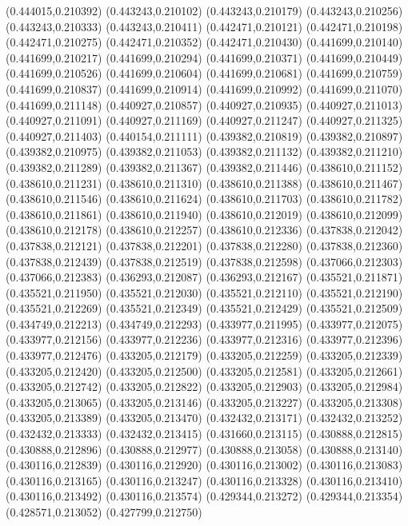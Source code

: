 (0.444015,0.210392)
(0.443243,0.210102)
(0.443243,0.210179)
(0.443243,0.210256)
(0.443243,0.210333)
(0.443243,0.210411)
(0.442471,0.210121)
(0.442471,0.210198)
(0.442471,0.210275)
(0.442471,0.210352)
(0.442471,0.210430)
(0.441699,0.210140)
(0.441699,0.210217)
(0.441699,0.210294)
(0.441699,0.210371)
(0.441699,0.210449)
(0.441699,0.210526)
(0.441699,0.210604)
(0.441699,0.210681)
(0.441699,0.210759)
(0.441699,0.210837)
(0.441699,0.210914)
(0.441699,0.210992)
(0.441699,0.211070)
(0.441699,0.211148)
(0.440927,0.210857)
(0.440927,0.210935)
(0.440927,0.211013)
(0.440927,0.211091)
(0.440927,0.211169)
(0.440927,0.211247)
(0.440927,0.211325)
(0.440927,0.211403)
(0.440154,0.211111)
(0.439382,0.210819)
(0.439382,0.210897)
(0.439382,0.210975)
(0.439382,0.211053)
(0.439382,0.211132)
(0.439382,0.211210)
(0.439382,0.211289)
(0.439382,0.211367)
(0.439382,0.211446)
(0.438610,0.211152)
(0.438610,0.211231)
(0.438610,0.211310)
(0.438610,0.211388)
(0.438610,0.211467)
(0.438610,0.211546)
(0.438610,0.211624)
(0.438610,0.211703)
(0.438610,0.211782)
(0.438610,0.211861)
(0.438610,0.211940)
(0.438610,0.212019)
(0.438610,0.212099)
(0.438610,0.212178)
(0.438610,0.212257)
(0.438610,0.212336)
(0.437838,0.212042)
(0.437838,0.212121)
(0.437838,0.212201)
(0.437838,0.212280)
(0.437838,0.212360)
(0.437838,0.212439)
(0.437838,0.212519)
(0.437838,0.212598)
(0.437066,0.212303)
(0.437066,0.212383)
(0.436293,0.212087)
(0.436293,0.212167)
(0.435521,0.211871)
(0.435521,0.211950)
(0.435521,0.212030)
(0.435521,0.212110)
(0.435521,0.212190)
(0.435521,0.212269)
(0.435521,0.212349)
(0.435521,0.212429)
(0.435521,0.212509)
(0.434749,0.212213)
(0.434749,0.212293)
(0.433977,0.211995)
(0.433977,0.212075)
(0.433977,0.212156)
(0.433977,0.212236)
(0.433977,0.212316)
(0.433977,0.212396)
(0.433977,0.212476)
(0.433205,0.212179)
(0.433205,0.212259)
(0.433205,0.212339)
(0.433205,0.212420)
(0.433205,0.212500)
(0.433205,0.212581)
(0.433205,0.212661)
(0.433205,0.212742)
(0.433205,0.212822)
(0.433205,0.212903)
(0.433205,0.212984)
(0.433205,0.213065)
(0.433205,0.213146)
(0.433205,0.213227)
(0.433205,0.213308)
(0.433205,0.213389)
(0.433205,0.213470)
(0.432432,0.213171)
(0.432432,0.213252)
(0.432432,0.213333)
(0.432432,0.213415)
(0.431660,0.213115)
(0.430888,0.212815)
(0.430888,0.212896)
(0.430888,0.212977)
(0.430888,0.213058)
(0.430888,0.213140)
(0.430116,0.212839)
(0.430116,0.212920)
(0.430116,0.213002)
(0.430116,0.213083)
(0.430116,0.213165)
(0.430116,0.213247)
(0.430116,0.213328)
(0.430116,0.213410)
(0.430116,0.213492)
(0.430116,0.213574)
(0.429344,0.213272)
(0.429344,0.213354)
(0.428571,0.213052)
(0.427799,0.212750)
